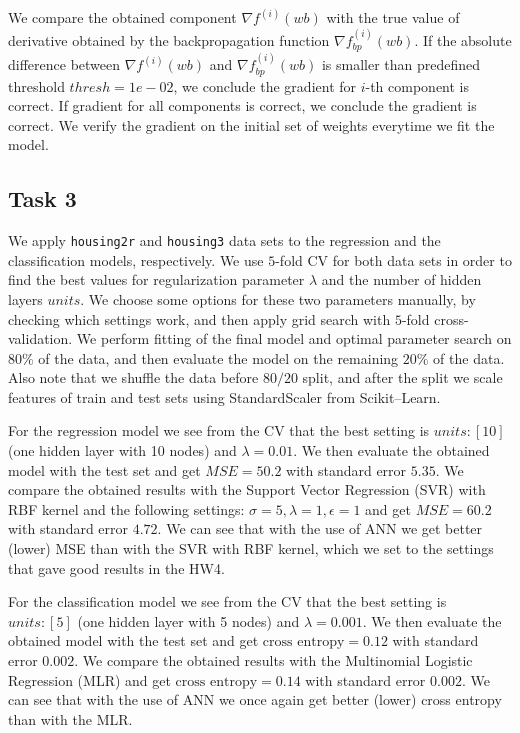 \documentclass[fleqn,moreauthors,10pt]{ds_report}
\begin{document}
We compare the obtained component $\nabla f^{(i)}(wb)$ with the true value of derivative obtained by the backpropagation function $\nabla f^{(i)}_{bp}(wb)$. If the absolute difference between $\nabla f^{(i)}(wb)$ and $\nabla f^{(i)}_{bp}(wb)$ is smaller than predefined threshold $thresh = 1e-02$, we conclude the gradient for $i$-th component is correct. If gradient for all components is correct, we conclude the gradient is correct. We verify the gradient on the initial set of weights everytime we fit the model.

\subsection*{Task 3}
We apply \texttt{housing2r} and \texttt{housing3} data sets to the regression and the classification models, respectively. We use $5$-fold CV for both data sets in order to find the best values for regularization parameter $\lambda$ and the number of hidden layers $units$. We choose some options for these two parameters manually, by checking which settings work, and then apply grid search with $5$-fold cross-validation. We perform fitting of the final model and optimal parameter search on $80 \%$ of the data, and then evaluate the model on the remaining $20\%$ of the data. Also note that we shuffle the data before $80/20$ split, and after the split we scale features of train and test sets using StandardScaler from Scikit--Learn. 

For the regression model we see from the CV that the best setting is $units: [10]$ (one hidden layer with 10 nodes) and $\lambda = 0.01$. We then evaluate the obtained model with the test set and get $MSE = 50.2$ with standard error $5.35$. We compare the obtained results with the Support Vector Regression (SVR) with RBF kernel and the following settings: $\sigma = 5, \lambda = 1, \epsilon = 1$ and get $MSE = 60.2$ with standard error $4.72$. We can see that with the use of ANN we get better (lower) MSE than with the SVR with RBF kernel, which we set to the settings that gave good results in the HW4.

For the classification model we see from the CV that the best setting is $units: [5]$ (one hidden layer with 5 nodes) and $\lambda = 0.001$. We then evaluate the obtained model with the test set and get $\text{cross entropy}= 0.12$ with standard error $0.002$. We compare the obtained results with the Multinomial Logistic Regression (MLR) and get $\text{cross entropy}= 0.14$ with standard error $0.002$. We can see that with the use of ANN we once again get better (lower) cross entropy than with the MLR.
\end{document}
